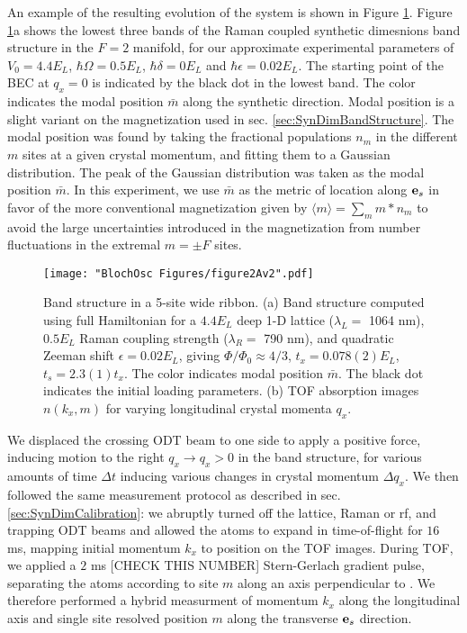 An example of the resulting evolution of the system is shown in Figure \ref{fig:kickBsTOF}. Figure \ref{fig:kickBsTOF}a shows the lowest three bands of the Raman coupled synthetic dimesnions band structure in the $F=2$ manifold, for our approximate experimental parameters of $V_0 = 4.4 E_L$, $\hbar\Omega = 0.5 E_L$, $\hbar\delta = 0 E_L$ and $\hbar\epsilon = 0.02 E_L$. The starting point of the BEC at $q_x=0$ is indicated by the black dot in the lowest band. The color indicates the modal position $\bar{m}$ along the synthetic direction. Modal position is a slight variant on the magnetization used in sec. \ref{sec:SynDimBandStructure}. The modal position was found by taking the fractional populations $n_{m}$ in the different $m$ sites at a given crystal momentum, and fitting them to a Gaussian distribution. The peak of the Gaussian distribution was taken as the modal position $\bar{m}$. In this experiment, we use $\bar{m}$ as the metric of location along $\textbf{e}_s{}$ in favor of the more conventional magnetization given by $\langle m\rangle=\sum_{m}m*n_{m}$ to avoid the large uncertainties introduced in the magnetization from number fluctuations in the extremal $m=\pm F$ sites. 
\begin{figure}
\texttt{[image: "BlochOsc Figures/figure2Av2".pdf]}
\caption{Band structure in a 5-site wide ribbon.  (a) Band structure computed using full Hamiltonian for a $4.4 E_L$ deep 1-D lattice ($\lambda_L=$ 1064 nm), $0.5 E_L$ Raman coupling strength ($\lambda_R = $ 790 nm), and quadratic Zeeman shift $\epsilon=0.02 E_L$, giving $\Phi/\Phi_0 \approx 4/3$, $t_x = 0.078(2) E_L$, $t_s=2.3(1) t_x$. The color indicates modal position $\bar{m}$. The black dot indicates the initial loading parameters.  (b) TOF absorption images $n(k_x,m)$ for varying longitudinal crystal momenta $q_x$.  }
\label{fig:kickBsTOF}
\end{figure}

We displaced the crossing ODT beam to one side to apply a positive force, inducing motion to the right $q_x\rightarrow q_x>0$ in the band structure, for various amounts of time $\Delta t$ inducing various changes in crystal momentum $\Delta q_x$. We then followed the same measurement protocol as described in sec. \ref{sec:SynDimCalibration}: we abruptly turned off the lattice, Raman or rf, and trapping ODT beams and allowed the atoms to expand in time-of-flight for $16$ ms, mapping initial momentum $k_x$ to position on the TOF images.  During TOF, we applied a $2$ ms [CHECK THIS NUMBER] Stern-Gerlach gradient pulse, separating the atoms according to site $m$ along an axis perpendicular to \ex{}. We therefore performed a hybrid measurment of momentum $k_x$ along the longitudinal \ex{} axis and single site resolved position $m$ along the transverse $\textbf{e}_s{}$ direction. 

